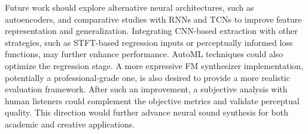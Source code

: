 Future work should explore alternative neural architectures, such as autoencoders, and comparative studies with RNNs and TCNs to improve feature representation and generalization. Integrating CNN-based extraction with other strategies, such as STFT-based regression inputs or perceptually informed loss functions, may further enhance performance. AutoML techniques could also optimize the regression stage. A more expressive FM synthesizer implementation, potentially a professional-grade one, is also desired to provide a more realistic evaluation framework. After such an improvement, a subjective analysis with human listeners could complement the objective metrics and validate perceptual quality. This direction would further advance neural sound synthesis for both academic and creative applications.
